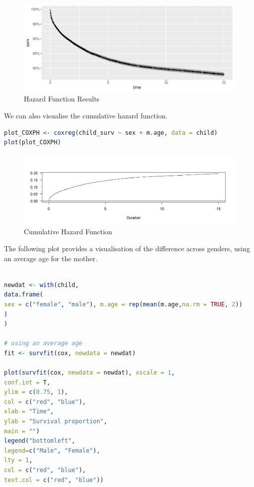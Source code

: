 \documentclass[12pt,letterpaper]{article}
\begin{document}
\begin{figure}[htbp]
	\includegraphics[width=1\linewidth]{Rplot}
	\caption{Hazard Function Results}
	\label{fig:rplot}
\end{figure}

\vspace{1cm}

\noindent We can also visualise the cumulative hazard function.

\begin{lstlisting}[language=R]
plot_COXPH <- coxreg(child_surv ~ sex + m.age, data = child)
plot(plot_COXPH)
\end{lstlisting}

\begin{figure}[htbp]
	\centering
	\includegraphics[width=1\linewidth]{Rplot05cumulative}
	\caption{Cumulative Hazard Function}
	\label{fig:rplot05cumulative}
\end{figure}

\newpage
\noindent The following plot provides a visualisation of the difference across genders, using an average age for the mother.

\begin{lstlisting}[language=R]

newdat <- with(child, 
data.frame(
sex = c("female", "male"), m.age = rep(mean(m.age,na.rm = TRUE, 2))
)
)

# using an average age
fit <- survfit(cox, newdata = newdat)

plot(survfit(cox, newdata = newdat), xscale = 1,
conf.int = T,
ylim = c(0.75, 1),
col = c("red", "blue"),
xlab = "Time",
ylab = "Survival proportion",
main = "")
legend("bottomleft",
legend=c("Male", "Female"),
lty = 1, 
col = c("red", "blue"),
text.col = c("red", "blue"))
\end{lstlisting}
\end{document}
